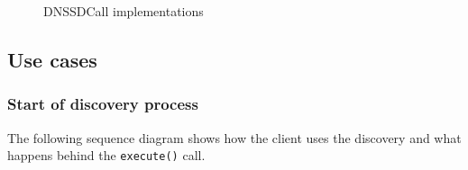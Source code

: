 \begin{figure}[H]
 \centering
 \caption{DNSSDCall implementations}
 \label{fig:network.discovery.manager}
\end{figure}


\subsection{Use cases}
\subsubsection{Start of discovery process}
The following sequence diagram shows how the client uses the discovery and what happens behind the \texttt{execute()} call.

